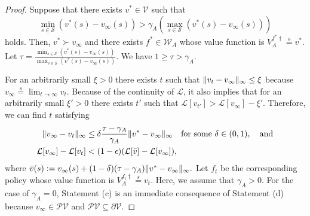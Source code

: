 \documentclass{acml}
\providecommand{\eqs}{\stackrel{s}{=}}
\DeclarePairedDelimiter{\norm}{\lVert}{\rVert}
\begin{document}
\begin{proof}
	Suppose that there exists $v^* \in \mathcal{V}$ such that $$\min_{s \in \mathcal{S}} (v^*(s) - v_\infty(s)) > \gamma_A(\max_{s \in \mathcal{S}} (v^*(s) - v_\infty(s)))$$ holds. 
	Then, $v^* \succ v_\infty$ and there exists $f^* \in \mathcal{W}_{A}$ whose value function is $V_A^{f^*\dag} \eqs v^*$. Let $\tau = \frac{ \min_{s \in \mathcal{S}} (v^*(s) - v_\infty(s)) }{ \max_{s \in \mathcal{S}} (v^*(s) - v_\infty(s)) }$. We have $1 \ge \tau > \gamma_A$. 
	
	For an arbitrarily small $\xi > 0$ there exists $t$ such that $\norm{v_t - v_\infty}_{\infty} \le \xi$ because $v_\infty \eqs \lim_{t\to\infty}v_t$.
	Because of the continuity of $\mathcal{L}$, it also implies that for an arbitrarily small $\xi' > 0$ there exists $t'$ such that $\mathcal{L}[v_{t'}] > \mathcal{L}[v_\infty] - \xi'$. 
	Therefore, we can find $t$ satisfying
	\begin{align}
		\norm{v_\infty - v_t}_\infty &\le \delta \frac{\tau - \gamma_A}{\gamma_A} \norm{v^{*} - v_\infty}_{\infty} \quad \text{for some $\delta \in (0, 1)$}, \quad \text{and} \label{eq:t-cond-2}
		\\
		\mathcal{L}[v_\infty] - \mathcal{L}[v_t] &< (1 - \epsilon) (\mathcal{L}[\bar{v}] - \mathcal{L}[v_\infty]), \label{eq:t-cond-1}
	\end{align}
    where $\bar{v}(s) := v_\infty(s) + (1 - \delta)(\tau - \gamma_A) \norm{v^{*} - v_\infty}_{\infty}.$
	Let $f_t$ be the corresponding policy whose value function is $V_A^{f_t\dag} \eqs v_t$. Here, we assume that $\gamma_A > 0$. For the case of $\gamma_A = 0$, Statement (c) is an immediate consequence of Statement (d) because $v_{\infty}\in\mathcal{PV}$ and $\mathcal{PV} \subseteq \partial \mathcal{V}$. 
	

\end{proof}
\end{document}
